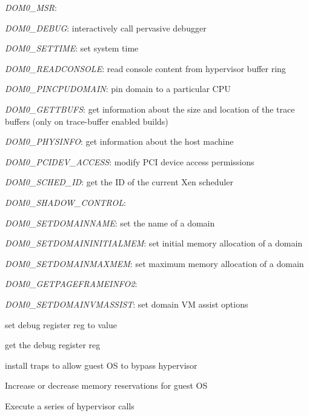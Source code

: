 \documentclass[11pt,twoside,final,openright]{xenstyle}
\begin{document}
{\it DOM0\_MSR}:

{\it DOM0\_DEBUG}: interactively call pervasive debugger

{\it DOM0\_SETTIME}: set system time

{\it DOM0\_READCONSOLE}: read console content from hypervisor buffer ring

{\it DOM0\_PINCPUDOMAIN}: pin domain to a particular CPU

{\it DOM0\_GETTBUFS}: get information about the size and location of
                      the trace buffers (only on trace-buffer enabled builds)

{\it DOM0\_PHYSINFO}: get information about the host machine

{\it DOM0\_PCIDEV\_ACCESS}: modify PCI device access permissions

{\it DOM0\_SCHED\_ID}: get the ID of the current Xen scheduler

{\it DOM0\_SHADOW\_CONTROL}:

{\it DOM0\_SETDOMAINNAME}: set the name of a domain

{\it DOM0\_SETDOMAININITIALMEM}: set initial memory allocation of a domain

{\it DOM0\_SETDOMAINMAXMEM}: set maximum memory allocation of a domain

{\it DOM0\_GETPAGEFRAMEINFO2}:

{\it DOM0\_SETDOMAINVMASSIST}: set domain VM assist options



set debug register reg to value



 get the debug register reg





 install traps to allow guest OS to bypass hypervisor



Increase or decrease memory reservations for guest OS



Execute a series of hypervisor calls


\end{document}
